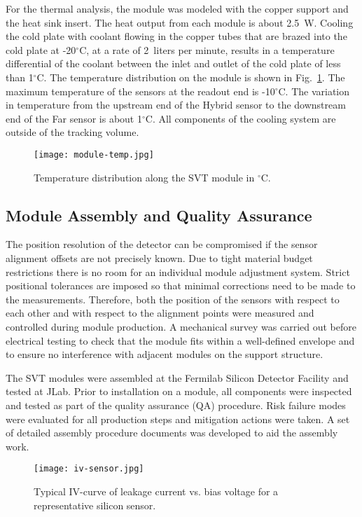For the thermal analysis, the module was modeled with the copper support and the heat sink insert. The heat output
from each module is about 2.5~W. Cooling the cold plate with coolant flowing in the copper tubes that are brazed into
the cold plate at -20$^\circ$C, at a rate of 2~liters per minute, results in a temperature differential of the coolant
between the inlet and outlet of the cold plate of less than 1$^\circ$C. The temperature distribution on the module is
shown in Fig.~\ref{fig:module-temp}. The maximum temperature of the sensors at the readout end is -10$^\circ$C.
The variation in temperature from the upstream end of the Hybrid sensor to the downstream end of the Far sensor
is about 1$^\circ$C. All components of the cooling system are outside of the tracking volume.

\begin{figure}[h] 
\centering 
\texttt{[image: module-temp.jpg]}
\caption{Temperature distribution along the SVT module in $^\circ$C.}
\label{fig:module-temp}
\end{figure}

\subsection{Module Assembly and Quality Assurance}

The position resolution of the detector can be compromised if the sensor alignment offsets are not precisely known.
Due to tight material budget restrictions there is no room for an individual module adjustment system. Strict
positional tolerances are imposed so that minimal corrections need to be made to the measurements. Therefore, both
the position of the sensors with respect to each other and with respect to the alignment points were measured and
controlled during module production. A mechanical survey was  carried out before electrical testing to check that the
module fits within a well-defined envelope and to ensure no interference with adjacent modules on the support
structure. 

The SVT modules were assembled at the Fermilab Silicon Detector Facility and tested at JLab. Prior to
installation on a module, all components were inspected and tested as part of the quality assurance (QA) procedure.
Risk failure modes were evaluated for all production steps and mitigation actions were taken. A set of detailed
assembly procedure documents was developed to aid the assembly work.

\begin{figure}[h] 
\centering 
\texttt{[image: iv-sensor.jpg]}
\caption{Typical IV-curve of leakage current vs. bias voltage for a representative silicon sensor.}
\label{fig:iv-sensor}
\end{figure}


